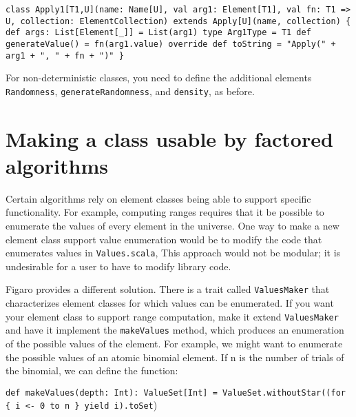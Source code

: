 \begin{flushleft}
\texttt{class Apply1[T1,U](name: Name[U], val arg1: Element[T1], val fn: T1
=> U, collection: ElementCollection)
\newline extends Apply[U](name, collection) \{
\newline \tab def args: List[Element[\_]] = List(arg1)
\newline 
\newline \tab type Arg1Type = T1
\newline 
\newline \tab def generateValue() = fn(arg1.value)
\newline 
\newline \tab override def toString = "Apply(" + arg1 + ", " + fn + ")"
\newline \}
}
\end{flushleft}

For non-deterministic classes, you need to define the additional elements \texttt{Randomness}, \texttt{generateRandomness}, and \texttt{density}, as before.

\section{Making a class usable by factored algorithms}

Certain algorithms rely on element classes being able to support specific functionality. For example, computing ranges requires that it be possible to enumerate the values of every element in the universe. One way to make a new element class support value enumeration would be to modify the code that enumerates values in \texttt{Values.scala}, This approach would not be modular; it is undesirable for a user to have to modify library code.

Figaro provides a different solution. There is a trait called \texttt{ValuesMa\-ker} that characterizes element classes for which values can be enumerated. If you want your element class to support range computation, make it extend \texttt{ValuesMaker} and have it implement the \texttt{makeValues} method, which produces an enumeration of the possible values of the element. For example, we might want to enumerate the possible values of an atomic binomial element. If n is the number of trials of the binomial, we can define the function:

\begin{flushleft}
\texttt{def makeValues(depth: Int): ValueSet[Int] = ValueSet.withoutStar((for \{ i <- 0 to n \} yield i).toSet})
\end{flushleft}


